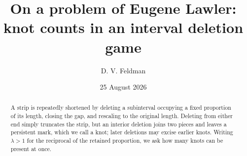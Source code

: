 \documentclass[11pt,reqno]{amsart}
\theoremstyle{plain}
\theoremstyle{definition}
\theoremstyle{remark}
\begin{document}
\title[On a problem of Eugene Lawler]{On a problem of Eugene Lawler:\\
knot counts in an interval deletion game}

\author{D. V. Feldman}
\address{Department of Mathematics and Statistics, University of New Hampshire,
Durham, New Hampshire 03824}

\date{25 August 2026}


\begin{abstract}
A strip is repeatedly shortened by deleting a subinterval occupying a fixed
proportion of its length, closing the gap, and rescaling to the original
length. Deleting from either end simply truncates the strip, but an interior
deletion joins two pieces and leaves a persistent mark, which we call a knot;
later deletions may excise earlier knots. Writing $\lambda>1$ for the reciprocal
of the retained proportion, we ask how many knots can be present at once.


\end{abstract}
\end{document}
